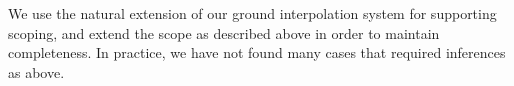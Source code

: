 We use the natural extension of our ground interpolation system for supporting scoping, and extend the scope as described above in order to maintain completeness. In practice, we have not found many cases that required inferences as above.

%
%
%
%
